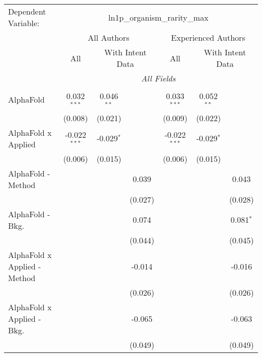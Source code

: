 \begingroup
\centering
\begin{tabular}{lcccccc}
   \tabularnewline \midrule \midrule
   Dependent Variable: & \multicolumn{6}{c}{ln1p\_organism\_rarity\_max}\\
 & \multicolumn{3}{c}{All Authors} & \multicolumn{3}{c}{Experienced Authors} \\
\cmidrule(lr){2-4} \cmidrule(lr){5-7}
 & \multicolumn{1}{c}{All} & \multicolumn{2}{c}{With Intent Data} & \multicolumn{1}{c}{All} & \multicolumn{2}{c}{With Intent Data} \\
\cmidrule(lr){2-2} \cmidrule(lr){3-4} \cmidrule(lr){5-5} \cmidrule(lr){6-7}
 & \multicolumn{6}{c}{\textit{All Fields}} \\ \\
   AlphaFold                      & 0.032$^{***}$  & 0.046$^{**}$ &             & 0.033$^{***}$  & 0.052$^{**}$ &   \\   
                                  & (0.008)        & (0.021)      &             & (0.009)        & (0.022)      &   \\   
   AlphaFold x Applied            & -0.022$^{***}$ & -0.029$^{*}$ &             & -0.022$^{***}$ & -0.029$^{*}$ &   \\   
                                  & (0.006)        & (0.015)      &             & (0.006)        & (0.015)      &   \\   
   AlphaFold - Method             &                &              & 0.039       &                &              & 0.043\\   
                                  &                &              & (0.027)     &                &              & (0.028)\\   
   AlphaFold - Bkg.               &                &              & 0.074       &                &              & 0.081$^{*}$\\   
                                  &                &              & (0.044)     &                &              & (0.045)\\   
   AlphaFold x Applied - Method   &                &              & -0.014      &                &              & -0.016\\   
                                  &                &              & (0.026)     &                &              & (0.026)\\   
   AlphaFold x Applied - Bkg.     &                &              & -0.065      &                &              & -0.063\\   
                                  &                &              & (0.049)     &                &              & (0.049)\\   

\end{tabular}
